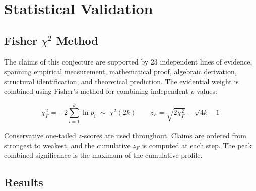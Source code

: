\documentclass[12pt,a4paper]{article}
\theoremstyle{definition}
\theoremstyle{remark}
\begin{document}
\section{Statistical Validation}

\subsection{Fisher $\chi^2$ Method}

The claims of this conjecture are supported by 23 independent lines of evidence,
spanning empirical measurement, mathematical proof, algebraic derivation,
structural identification, and theoretical prediction.
The evidential weight is combined using Fisher's method for combining independent
$p$-values:

\[\chi^2_F = -2\sum_{i=1}^k \ln p_i \;\sim\; \chi^2(2k)
\qquad z_F = \sqrt{2\chi^2_F} - \sqrt{4k-1}\]

Conservative one-tailed $z$-scores are used throughout.
Claims are ordered from strongest to weakest, and the cumulative $z_F$ is
computed at each step. The peak combined significance is the maximum of the
cumulative profile.

\subsection{Results}
\end{document}
